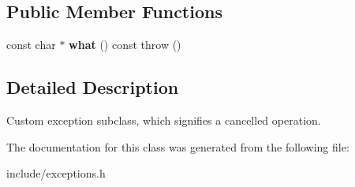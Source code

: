 \subsection*{Public Member Functions}
\begin{DoxyCompactItemize}
\item 
\mbox{\label{classOperationCanceled_ae544f829d25de3cd4221c9912e21d7a1}} 
const char $\ast$ {\bfseries what} () const  throw ()
\end{DoxyCompactItemize}


\subsection{Detailed Description}
Custom exception subclass, which signifies a cancelled operation. 

The documentation for this class was generated from the following file\+:\begin{DoxyCompactItemize}
\item 
include/exceptions.\+h\end{DoxyCompactItemize}
